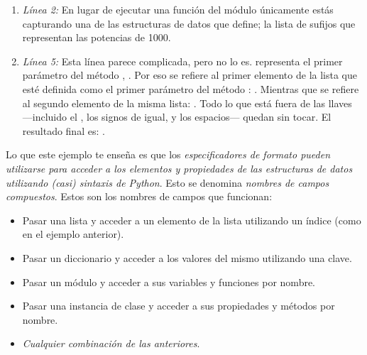 \begin{enumerate}

\item \emph{Línea 2:} En lugar de ejecutar una función del módulo  únicamente estás capturando una de las estructuras de datos que define; la lista de sufijos que representan las potencias de 1000.

\item \emph{Línea 5:} Esta línea parece complicada, pero no lo es.  representa el primer parámetro del método , . Por eso  se refiere al primer elemento de la lista que esté definida como el primer parámetro del método : . Mientras que  se refiere al segundo elemento de la misma lista: . Todo lo que está fuera de las llaves ---incluido el , los signos de igual, y los espacios--- quedan sin tocar. El resultado final es: .

\end{enumerate}


Lo que este ejemplo te enseña es que los \emph{especificadores de formato pueden utilizarse para acceder a los elementos y propiedades de las estructuras de datos utilizando (casi) sintaxis de Python}. Esto se denomina \emph{nombres de campos compuestos}. Estos son los nombres de campos que funcionan:

\begin{itemize}

\item Pasar una lista y acceder a un elemento de la lista utilizando un índice (como en el ejemplo anterior).

\item Pasar un diccionario y acceder a los valores del mismo utilizando una clave.

\item Pasar un módulo y acceder a sus variables y funciones por nombre.

\item Pasar una instancia de clase y acceder a sus propiedades y métodos por nombre.

\item \emph{Cualquier combinación de las anteriores}.

\end{itemize}

